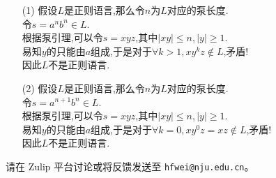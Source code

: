 \documentclass[a4paper, justified]{tufte-handout}
\begin{document}
\begin{solution}
\begin{enumerate}
    \item[(1)] 假设$L$是正则语言,那么令$n$为$L$对应的泵长度. \\
     令$s = a^nb^n \in L$. \\
     根据泵引理,可以令$s=xyz$,其中$|xy|\leq n,|y|\geq 1$. \\
     易知$y$的只能由$a$组成,于是对于$\forall k > 1, xy^kz\notin L$,矛盾! \\
     因此$L$不是正则语言.
     \item[(2)] 假设$L$是正则语言,那么令$n$为$L$对应的泵长度. \\
     令$s = a^{n+1}b^n \in L$. \\
     根据泵引理,可以令$s=xyz$,其中$|xy|\leq n,|y|\geq 1$. \\
     易知$y$的只能由$a$组成,于是对于$\forall k=0, xy^0z=xz\notin L$,矛盾! \\
     因此$L$不是正则语言.
\end{enumerate}
\end{solution}


\beginfb

请在 Zulip 平台讨论或将反馈发送至 \texttt{hfwei@nju.edu.cn}。
\end{document}
